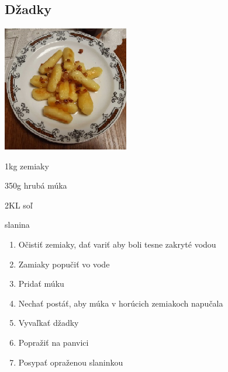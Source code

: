 \setcounter{step}{0}
\subsection{Džadky}

\begin{ingredient}
\includegraphics[height=5.5cm]{images/dzadky}
\def\portions{4}%

\begin{main}
	\item 1kg zemiaky
	\item 350g hrubá múka
	\item 2KL soľ
	\item slanina
	
\end{main}
\end{ingredient}
\begin{recipe}

\begin{enumerate}

\item{Očistiť zemiaky, dať variť aby boli tesne zakryté vodou}
\item{Zamiaky popučiť vo vode}
\item{Pridať múku}	
\item{Nechať postáť, aby múka v horúcich zemiakoch napučala}
\item{Vyvaľkať džadky}
\item{Popražiť na panvici}
\item{Posypať opraženou slaninkou}

\end{enumerate}
\end{recipe}

\begin{notes}

\end{notes}
\clearpage	